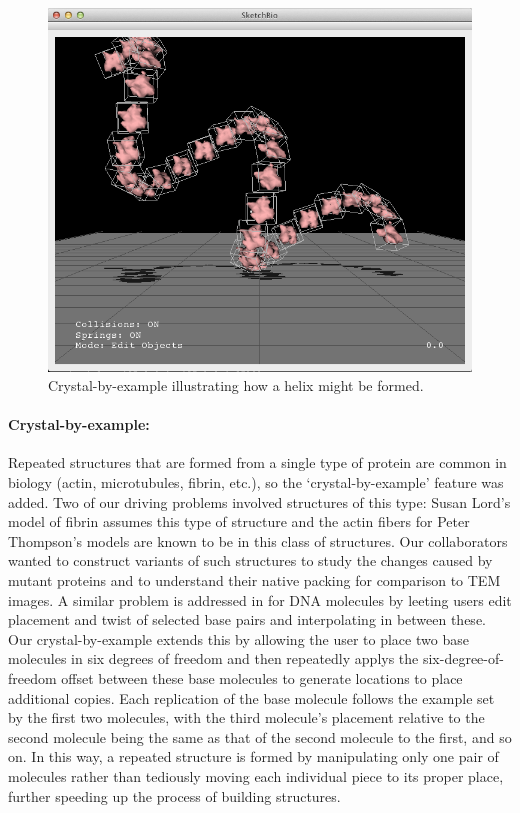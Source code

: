 \documentclass[twocolumn]{bmcart}%
\begin{document}
\begin{figure}[h]
\centering
\includegraphics[width=0.9\columnwidth]{crystalByExample.png}
\caption{Crystal-by-example illustrating how a helix might be formed.}
\label{fig:crystal_by_example}
\end{figure}
\paragraph*{Crystal-by-example:}
Repeated structures that are formed from a single type of protein are common in biology (actin, microtubules, fibrin, etc.), so the ‘crystal-by-example' feature was added.
Two of our driving problems involved structures of this type: Susan Lord's model of fibrin assumes this type of structure and the actin fibers for Peter Thompson's models are known to be in this class of structures.
Our collaborators wanted to construct variants of such structures to study the changes caused by mutant proteins and to understand their native packing for comparison to TEM images.
A similar problem is addressed in \cite{hornus2013easy} for DNA molecules by leeting users edit placement and twist of selected base pairs and interpolating in between these.
Our crystal-by-example extends this by allowing the user to place two base molecules in six degrees of freedom and then repeatedly applys the six-degree-of-freedom offset between these base molecules to generate locations to place additional copies.
Each replication of the base molecule follows the example set by the first two molecules, with the third molecule's placement relative to the second molecule being the same as that of the second molecule to the first, and so on.
In this way, a repeated structure is formed by manipulating only one pair of molecules rather than tediously moving each individual piece to its proper place, further speeding up the process of building structures.
\end{document}
